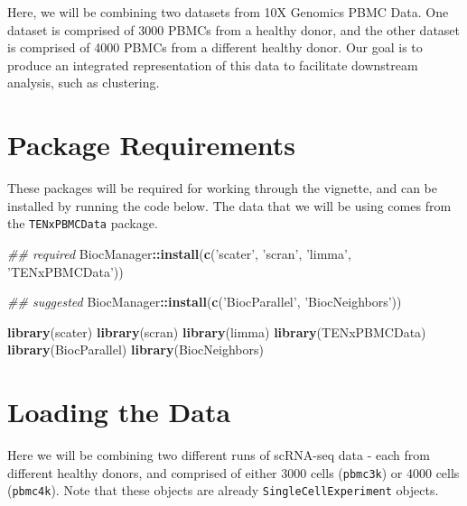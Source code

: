\documentclass[]{book}
\newenvironment{Shaded}{\begin{snugshade}}{\end{snugshade}}
\newcommand{\CommentTok}[1]{\textcolor[rgb]{0.56,0.35,0.01}{\textit{#1}}}
\newcommand{\KeywordTok}[1]{\textcolor[rgb]{0.13,0.29,0.53}{\textbf{#1}}}
\newcommand{\NormalTok}[1]{#1}
\newcommand{\OperatorTok}[1]{\textcolor[rgb]{0.81,0.36,0.00}{\textbf{#1}}}
\newcommand{\StringTok}[1]{\textcolor[rgb]{0.31,0.60,0.02}{#1}}
\begin{document}
Here, we will be combining two datasets from 10X Genomics PBMC Data. One dataset is comprised of 3000 PBMCs from a healthy donor, and the other dataset is comprised of 4000 PBMCs from a different healthy donor. Our goal is to produce an integrated representation of this data to facilitate downstream analysis, such as clustering.

\hypertarget{package-requirements}{%
\section{Package Requirements}\label{package-requirements}}

These packages will be required for working through the vignette, and can be installed by running the code below. The data that we will be using comes from the \texttt{TENxPBMCData} package.

\begin{Shaded}
\begin{Highlighting}[]
\CommentTok{## required}
\NormalTok{BiocManager}\OperatorTok{::}\KeywordTok{install}\NormalTok{(}\KeywordTok{c}\NormalTok{(}\StringTok{'scater'}\NormalTok{, }\StringTok{'scran'}\NormalTok{, }\StringTok{'limma'}\NormalTok{, }\StringTok{'TENxPBMCData'}\NormalTok{))}

\CommentTok{## suggested}
\NormalTok{BiocManager}\OperatorTok{::}\KeywordTok{install}\NormalTok{(}\KeywordTok{c}\NormalTok{(}\StringTok{'BiocParallel'}\NormalTok{, }\StringTok{'BiocNeighbors'}\NormalTok{))}
\end{Highlighting}
\end{Shaded}

\begin{Shaded}
\begin{Highlighting}[]
\KeywordTok{library}\NormalTok{(scater)}
\KeywordTok{library}\NormalTok{(scran)}
\KeywordTok{library}\NormalTok{(limma)}
\KeywordTok{library}\NormalTok{(TENxPBMCData)}
\KeywordTok{library}\NormalTok{(BiocParallel)}
\KeywordTok{library}\NormalTok{(BiocNeighbors)}
\end{Highlighting}
\end{Shaded}

\hypertarget{loading-the-data}{%
\section{Loading the Data}\label{loading-the-data}}

Here we will be combining two different runs of scRNA-seq data - each from different healthy donors, and comprised of either 3000 cells (\texttt{pbmc3k}) or 4000 cells (\texttt{pbmc4k}). Note that these objects are already \texttt{SingleCellExperiment} objects.
\end{document}
